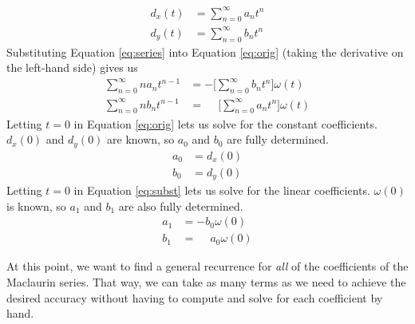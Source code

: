\documentclass{report}
\begin{document}
\begin{equation} \label{eq:series}
    \begin{aligned}
    d_x(t) &= \sum_{n=0}^\infty a_n t^n \\
    d_y(t) &= \sum_{n=0}^\infty b_n t^n
    \end{aligned}
\end{equation}
Substituting Equation \ref{eq:series} into Equation \ref{eq:orig}
(taking the derivative on the left-hand side) gives us
\begin{equation} \label{eq:subst}
    \begin{aligned}
    \sum_{n=0}^\infty n a_n t^{n-1} &=
        -\Bigg[\sum_{n=0}^\infty b_n t^n \Bigg]
        \omega(t) \\
    \sum_{n=0}^\infty n b_n t^{n-1} &=
        \phantom{-}\Bigg[\sum_{n=0}^\infty a_n t^n \Bigg]
        \omega(t)
    \end{aligned}
\end{equation}
Letting $t=0$ in Equation \ref{eq:orig} lets us solve for the constant coefficients. $d_x(0)$ and $d_y(0)$ are known,
so $a_0$ and $b_0$ are fully determined.
\begin{equation} \label{eq:coeff0}
    \begin{aligned}
        a_0 &= d_x(0) \\
        b_0 &= d_y(0)
    \end{aligned}
\end{equation}
Letting $t=0$ in
Equation \ref{eq:subst} lets us solve for the linear coefficients. $\omega(0)$ is known, so $a_1$ and $b_1$ are also
fully determined.
\begin{equation} \label{eq:coeff1}
    \begin{aligned}
    a_1 &= -b_0\omega(0) \\
    b_1 &= \phantom{-}a_0\omega(0)
    \end{aligned}
\end{equation}

At this point, we want to find a general recurrence for \emph{all} of the
coefficients of the Maclaurin series. That way, we can take as many
terms as we need to achieve the desired accuracy without having to
compute and solve for each coefficient by hand.
\end{document}
